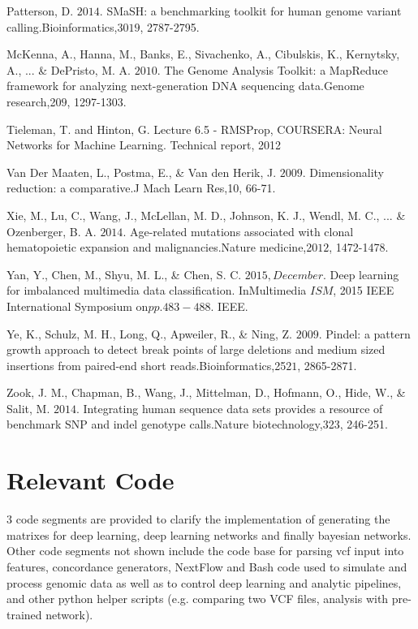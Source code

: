 \documentclass{article}
\begin{document}
\begin{list}{}{%
\setlength{\topsep}{0pt}%
\setlength{\leftmargin}{0.5in}%
\setlength{\listparindent}{-0.5in}%
\setlength{\itemindent}{-0.5in}%
\setlength{\parsep}{\parskip}%
}
Patterson, D. \(2014\). SMaSH: a benchmarking toolkit for human genome variant calling.Bioinformatics,30\(19\), 2787-2795.\\\item[] McKenna, A., Hanna, M., Banks, E., Sivachenko, A., Cibulskis, K., Kernytsky, A., ... \& DePristo, M. A. \(2010\). The Genome Analysis Toolkit: a MapReduce framework for analyzing next-generation DNA sequencing data.Genome research,20\(9\), 1297-1303.\\\item[] Tieleman, T. and Hinton, G. Lecture 6.5 - RMSProp, COURSERA: Neural Networks for Machine Learning. Technical report, 2012\\\item[] Van Der Maaten, L., Postma, E., \& Van den Herik, J. \(2009\). Dimensionality reduction: a comparative.J Mach Learn Res,10, 66-71.\\\item[] Xie, M., Lu, C., Wang, J., McLellan, M. D., Johnson, K. J., Wendl, M. C., ... \& Ozenberger, B. A. \(2014\). Age-related mutations associated with clonal hematopoietic expansion and malignancies.Nature medicine,20\(12\), 1472-1478.\\\item[] Yan, Y., Chen, M., Shyu, M. L., \& Chen, S. C. \(2015, December\). Deep learning for imbalanced multimedia data classification. InMultimedia \(ISM\), 2015 IEEE International Symposium on\(pp. 483-488\). IEEE.\\\item[] Ye, K., Schulz, M. H., Long, Q., Apweiler, R., \& Ning, Z. \(2009\). Pindel: a pattern growth approach to detect break points of large deletions and medium sized insertions from paired-end short reads.Bioinformatics,25\(21\), 2865-2871.\\\item[] Zook, J. M., Chapman, B., Wang, J., Mittelman, D., Hofmann, O., Hide, W., \& Salit, M. \(2014\). Integrating human sequence data sets provides a resource of benchmark SNP and indel genotype calls.Nature biotechnology,32\(3\), 246-251.\\


\end{list}

\newpage
\section{Relevant Code}
3 code segments are provided to clarify the implementation of generating the matrixes for deep learning, deep learning networks and finally bayesian networks. Other code segments not shown include the code base for parsing vcf input into features, concordance generators, NextFlow and Bash code used to simulate and process genomic data as well as to control deep learning and analytic pipelines, and other python helper scripts (e.g. comparing two VCF files, analysis with pre-trained network).
\end{document}
